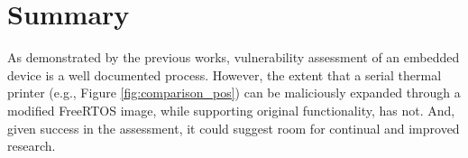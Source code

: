 \section{Summary} \label{introductionsummary}

As demonstrated by the previous works, vulnerability assessment of an embedded device is a well documented process. However, the extent that a serial thermal printer (e.g., Figure \ref{fig:comparison_pos}) can be maliciously expanded through a modified FreeRTOS image, while supporting original functionality, has not. And, given success in the assessment, it could suggest room for continual and improved research.